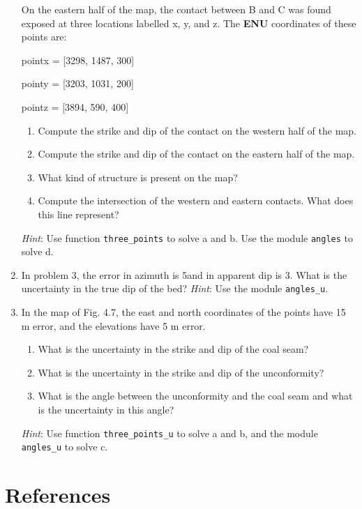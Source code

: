 \documentclass[a4paper , 12pt]{book}
\newcommand{\code}[1]{\colorbox{light-gray}{\texttt{#1}}}
\begin{document}
\begin{enumerate}
    On the eastern half of the map, the contact between B and C was found exposed at three locations labelled x, y, and z. The \textbf{ENU} coordinates of these points are:
    
    pointx = [3298, 1487, 300]
    
    pointy = [3203, 1031, 200]
    
    pointz = [3894, 590, 400]
    
    \begin{enumerate}
        \item Compute the strike and dip of the contact on the western half of the map.
        \item Compute the strike and dip of the contact on the eastern half of the map.
        \item What kind of structure is present on the map? 
        \item Compute the intersection of the western and eastern contacts. What does this line represent?
    \end{enumerate}
    
     \textit{Hint}: Use function \code{three\_points} to solve a and b. Use the module \code{angles} to solve d.
     
     \item In problem 3, the error in azimuth is 5\degree\space and in apparent dip is 3\degree. What is the uncertainty in the true dip of the bed? \textit{Hint}: Use the module \code{angles\_u}.
     
     \item In the map of Fig. 4.7, the east and north coordinates of the points have 15 m error, and the elevations have 5 m error. 
     \begin{enumerate}
        \item What is the uncertainty in the strike and dip of the coal seam?
        \item What is the uncertainty in the strike and dip of the unconformity?
        \item What is the angle between the unconformity and the coal seam and what is the uncertainty in this angle?
    \end{enumerate}
    \textit{Hint}: Use function \code{three\_points\_u} to solve a and b, and the module \code{angles\_u} to solve c.

\end{enumerate}

\section*{References}
\end{document}
